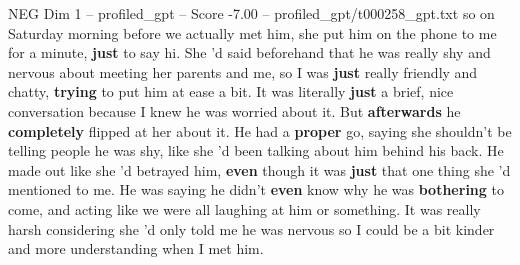 \begin{textsample}{NEG Dim 1 – profiled\_gpt – Score -7.00 – profiled\_gpt/t000258\_gpt.txt}  \label{ex:f1_neg_020}
so on Saturday morning before we actually met him, she put him on the phone to me for a minute, \textbf{just} to say hi.
She ’d said beforehand that he was really shy and nervous about meeting her parents and me, so I was \textbf{just} really friendly and chatty, \textbf{trying} to put him at ease a bit.
It was literally \textbf{just} a brief, nice conversation because I knew he was worried about it.
But \textbf{afterwards} he \textbf{completely} flipped at her about it.
He had a \textbf{proper} go, saying she shouldn't be telling people he was shy, like she ’d been talking about him behind his back.
He made out like she ’d betrayed him, \textbf{even} though it was \textbf{just} that one thing she ’d mentioned to me.
He was saying he didn't \textbf{even} know why he was \textbf{bothering} to come, and acting like we were all laughing at him or something.
It was really harsh considering she ’d only told me he was nervous so I could be a bit kinder and more understanding when I met him.

\end{textsample}
